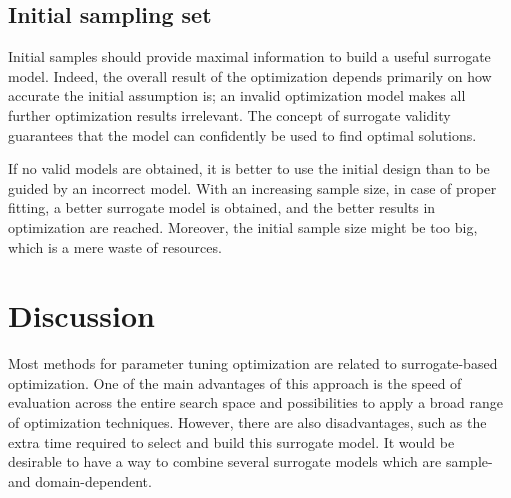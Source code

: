         \subsection{Initial sampling set}
        Initial samples should provide maximal information to build a useful surrogate model. Indeed, the overall result of the optimization depends primarily on how accurate the initial assumption is; an invalid optimization model makes all further optimization results irrelevant. The concept of surrogate validity guarantees that the model can confidently be used to find optimal solutions.

        If no valid models are obtained, it is better to use the initial design than to be guided by an incorrect model. With an increasing sample size, in case of proper fitting, a better surrogate model is obtained, and the better results in optimization are reached. Moreover, the initial sample size might be too big, which is a mere waste of resources.    


    \section{Discussion}
    Most methods for parameter tuning optimization are related to surrogate-based optimization. One of the main advantages of this approach is the speed of evaluation across the entire search space and possibilities to apply a broad range of optimization techniques. However, there are also disadvantages, such as the extra time required to select and build this surrogate model. 
    It would be desirable to have a way to combine several surrogate models which are sample- and domain-dependent.



